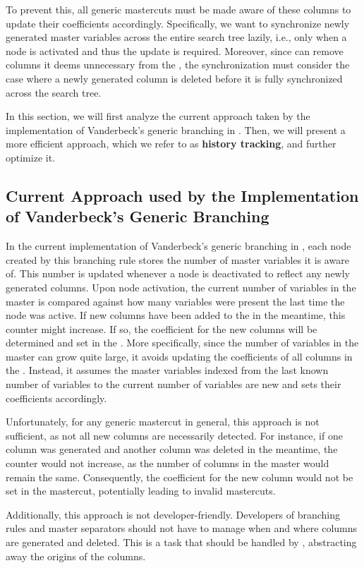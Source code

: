To prevent this, all generic mastercuts must be made aware of these columns to update their coefficients accordingly. Specifically, we want to synchronize newly generated master variables across the entire search tree lazily, i.e., only when a node is activated and thus the update is required. Moreover, since \GCG{} can remove columns it deems unnecessary from the \MP{}, the synchronization must consider the case where a newly generated column is deleted before it is fully synchronized across the search tree.

In this section, we will first analyze the current approach taken by the implementation of Vanderbeck's generic branching in \GCG{}. Then, we will present a more efficient approach, which we refer to as \textbf{history tracking}, and further optimize it.

\subsection{Current Approach used by the Implementation of Vanderbeck's Generic Branching}\label{subsec:gm_sync_current}
In the current implementation of Vanderbeck's generic branching in \GCG{}, each node created by this branching rule stores the number of master variables it is aware of. This number is updated whenever a node is deactivated to reflect any newly generated columns. Upon node activation, the current number of variables in the master is compared against how many variables were present the last time the node was active. If new columns have been added to the \RMP{} in the meantime, this counter might increase. If so, the coefficient for the new columns will be determined and set in the \RMP{}. More specifically, since the number of variables in the master can grow quite large, it avoids updating the coefficients of all columns in the \RMP{}. Instead, it assumes the master variables indexed from the last known number of variables to the current number of variables are new and sets their coefficients accordingly.

Unfortunately, for any generic mastercut in general, this approach is not sufficient, as not all new columns are necessarily detected. For instance, if one column was generated and another column was deleted in the meantime, the counter would not increase, as the number of columns in the master would remain the same. Consequently, the coefficient for the new column would not be set in the mastercut, potentially leading to invalid mastercuts.

Additionally, this approach is not developer-friendly. Developers of branching rules and master separators should not have to manage when and where columns are generated and deleted. This is a task that should be handled by \GCG{}, abstracting away the origins of the columns.

